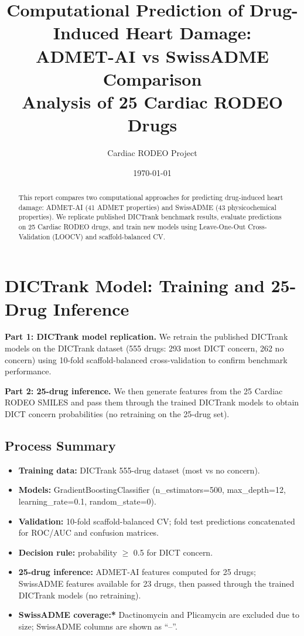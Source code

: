 \documentclass[11pt]{article}
\title{Computational Prediction of Drug-Induced Heart Damage:\\
ADMET-AI vs SwissADME Comparison\\
\large Analysis of 25 Cardiac RODEO Drugs}
\author{Cardiac RODEO Project}
\date{\today}
\begin{document}
\maketitle

\begin{abstract}
This report compares two computational approaches for predicting drug-induced heart damage:
ADMET-AI (41 ADMET properties) and SwissADME (43 physicochemical properties).
We replicate published DICTrank benchmark results, evaluate predictions on 25 Cardiac RODEO drugs,
and train new models using Leave-One-Out Cross-Validation (LOOCV) and scaffold-balanced CV.
\end{abstract}

\section{DICTrank Model: Training and 25-Drug Inference}

\textbf{Part 1: DICTrank model replication.}
We retrain the published DICTrank models on the DICTrank dataset (555 drugs: 293 most DICT concern, 262 no concern)
using 10-fold scaffold-balanced cross-validation to confirm benchmark performance.

\textbf{Part 2: 25-drug inference.}
We then generate features from the 25 Cardiac RODEO SMILES and pass them through the trained DICTrank models
to obtain DICT concern probabilities (no retraining on the 25-drug set).

\subsection{Process Summary}
\begin{itemize}
    \item \textbf{Training data:} DICTrank 555-drug dataset (most vs no concern).
    \item \textbf{Models:} GradientBoostingClassifier (n\_estimators=500, max\_depth=12, learning\_rate=0.1, random\_state=0).
    \item \textbf{Validation:} 10-fold scaffold-balanced CV; fold test predictions concatenated for ROC/AUC and confusion matrices.
    \item \textbf{Decision rule:} probability $\ge$ 0.5 for DICT concern.
    \item \textbf{25-drug inference:} ADMET-AI features computed for 25 drugs; SwissADME features available for 23 drugs, then passed through the trained DICTrank models (no retraining).
    \item \textbf{SwissADME coverage:*} Dactinomycin and Plicamycin are excluded due to size; SwissADME columns are shown as ``--''.
\end{itemize}
\end{document}
